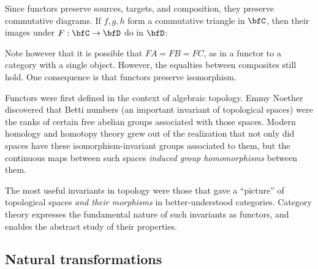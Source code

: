 \documentclass[a5paper]{article}
\begin{document}
Since functors preserve sources, targets, and composition, they preserve
commutative diagrams. If $f,g,h$ form a commutative triangle in $\bfC$, then
their images under $F:\bfC\to\bfD$ do in $\bfD$:
\begin{center}
\end{center}
Note however that it is possible that $FA=FB=FC$, as in a functor to a category
with a single object. However, the equalties between composites still hold.
One consequence is that functors preserve isomorphism.

\begin{remark*}
  Functors were first defined in the context of algebraic topology. Emmy Noether
  discovered that Betti numbers (an important invariant of topological spaces)
  were the ranks of certain free abelian groups associated with those spaces. 
  Modern homology and homotopy theory grew out of the realization
  that not only did spaces have these isomorphism-invariant groups associated to
  them, but the continuous maps between such spaces \textit{induced group
  homomorphisms} between them.

  The most useful invariants in topology were those that gave a ``picture'' of
  topological spaces \textit{and their morphisms} in better-understood categories.
  Category theory expresses the fundamental nature of such invariants as
  functors, and enables the abstract study of their properties.
\end{remark*}

\subsection{Natural transformations}
\end{document}
